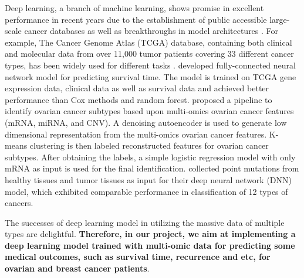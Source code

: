 \documentclass{article}
\begin{document}
Deep learning, a branch of machine learning, shows promise in excellent performance in recent years due to the establishment of public accessible large-scale cancer databases as well as breakthroughs in model architectures \citep{zhu2020application}. For example, The Cancer Genome Atlas (TCGA) database, containing both clinical and molecular data from over 11,000 tumor patients covering 33 different cancer types, has been widely used for different tasks \citep{tomczak2015cancer}. \citealp{ching2018cox} developed fully-connected neural network model for predicting survival time. The model is trained on TCGA gene expression data, clinical data as well as survival data and achieved better performance than Cox methods and random forest. \citealp{guo2020deep} proposed a pipeline to identify ovarian cancer subtypes based upon multi-omics ovarian cancer features (mRNA, miRNA, and CNV). A denoising autoencoder is used to generate low dimensional representation from the multi-omics ovarian cancer features. K-means clustering is then labeled reconstructed features for ovarian cancer subtypes. After obtaining the labels, a simple logistic regression model with only mRNA as input is used for the final identification. \citealp{sun2019identification} collected point mutations from healthy tissues and tumor tissues as input for their deep neural network (DNN) model, which exhibited comparable performance in classification of 12 types of cancers.

The successes of deep learning model in utilizing the massive data of multiple types are delightful. \textbf{Therefore, in our project, we aim at implementing a deep learning model trained with multi-omic data for predicting some medical outcomes, such as survival time, recurrence and etc, for ovarian and breast cancer patients}.




\end{document}
